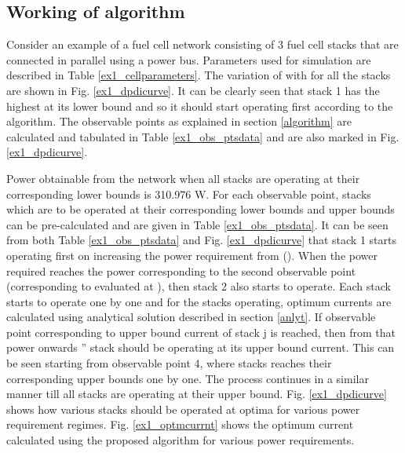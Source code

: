 \documentclass[twocolumn]{autart}
\begin{document}
\subsection{Working of algorithm}
Consider an example of a fuel cell network consisting of 3 fuel cell stacks that are connected in parallel using a power bus. Parameters used for simulation are described in Table \ref{ex1_cellparameters}. The variation of  with  for all the stacks are shown in Fig. \ref{ex1_dpdicurve}. It can be clearly seen that stack 1 has the highest  at its lower bound and so it should start operating first according to the algorithm. The observable points as explained in section \ref{algorithm} are calculated and tabulated in Table \ref{ex1_obs_ptsdata} and are also marked in Fig. \ref{ex1_dpdicurve}. 
\begin{table}[h]
  \centering
  \caption{Parameters for a fuel cell network with 3 fuel cell stacks}
    \label{ex1_cellparameters}\end{table}Power obtainable from the network when all stacks are operating at their corresponding lower bounds is 310.976 W. For each observable point, stacks which are to be operated at their corresponding lower bounds and upper bounds can be pre-calculated and are given in Table \ref{ex1_obs_ptsdata}. It can be seen from both Table \ref{ex1_obs_ptsdata} and Fig. \ref{ex1_dpdicurve} that stack 1 starts operating first on increasing the power requirement from  (). When the power required reaches the power corresponding to the second observable point (corresponding to  evaluated at ), then stack 2 also starts to operate. Each stack starts to operate one by one and for the stacks operating, optimum currents are calculated using analytical solution described in section \ref{anlyt}. If observable point corresponding to upper bound current of stack j is reached, then from that power onwards '' stack should be operating at its upper bound current. This can be seen starting from observable point 4, where stacks reaches their corresponding upper bounds one by one. The process continues in a similar manner till all stacks are operating at their upper bound. Fig. \ref{ex1_dpdicurve} shows how various stacks should be operated at optima for various power requirement regimes. Fig. \ref{ex1_optmcurrnt} shows the optimum current calculated using the proposed algorithm for various power requirements.
\end{document}

